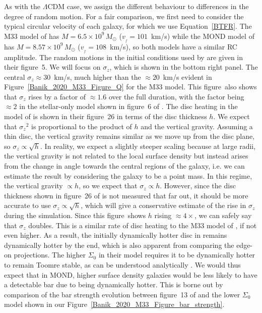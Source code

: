 \documentclass[fleqn,usenatbib,useAMS,onecolumn]{mnras} %
\begin{document}
As with the $\Lambda$CDM case, we assign the different behaviour to differences in the degree of random motion. For a fair comparison, we first need to consider the typical circular velocity of each galaxy, for which we use Equation~\ref{BTFR}. The M33 model of \citet{Banik_2020_M33} has $M = 6.5 \times 10^9 \, M_\odot$ ($v_{_f} = 101$~km/s) while the MOND model of \citet{Roshan_2021_disc_stability} has $M = 8.57 \times 10^9 \, M_\odot$ ($v_{_f} = 108$~km/s), so both models have a similar RC amplitude. The random motions in the initial conditions used by \citet{Roshan_2021_disc_stability} are given in their figure~5. We will focus on $\sigma_z$, which is shown in the bottom right panel. The central $\sigma_z \approx 30$~km/s, much higher than the $\approx 20$~km/s evident in Figure~\ref{Banik_2020_M33_Figure_Q} for the M33 model. This figure~also shows that $\sigma_z$ rises by a factor of $\approx 1.6$ over the full duration, with the factor being $\approx 2$ in the stellar-only model shown in figure~6 of \citet{Banik_2020_M33}. The disc heating in the model of \citet{Roshan_2021_disc_stability} is shown in their figure~26 in terms of the disc thickness $h$. We expect that ${\sigma_z}^2$ is proportional to the product of $h$ and the vertical gravity. Assuming a thin disc, the vertical gravity remains similar as we move up from the disc plane, so $\sigma_z \propto \sqrt{h}$. In reality, we expect a slightly steeper scaling because at large radii, the vertical gravity is not related to the local surface density but instead arises from the change in angle towards the central regions of the galaxy, i.e. we can estimate the result by considering the galaxy to be a point mass. In this regime, the vertical gravity $\propto h$, so we expect that $\sigma_z \propto h$. However, since the disc thickness shown in figure~26 of \citet{Roshan_2021_disc_stability} is not measured that far out, it should be more accurate to use $\sigma_z \propto \sqrt{h}$, which will give a conservative estimate of the rise in $\sigma_z$ during the simulation. Since this figure~shows $h$ rising $\approx 4\times$, we can safely say that $\sigma_z$ doubles. This is a similar rate of disc heating to the M33 model of \citet{Banik_2020_M33}, if not even higher. As a result, the initially dynamically hotter disc in \citet{Roshan_2021_disc_stability} remains dynamically hotter by the end, which is also apparent from comparing the edge-on projections. The higher $\Sigma_0$ in their model requires it to be dynamically hotter to remain Toomre stable, as can be understood analytically \citep{Banik_2018_Toomre}. We would thus expect that in MOND, higher surface density galaxies would be less likely to have a detectable bar due to being dynamically hotter. This is borne out by comparison of the bar strength evolution between figure~13 of \citet{Roshan_2021_disc_stability} and the lower $\Sigma_0$ model shown in our Figure~\ref{Banik_2020_M33_Figure_bar_strength}.
\end{document}
